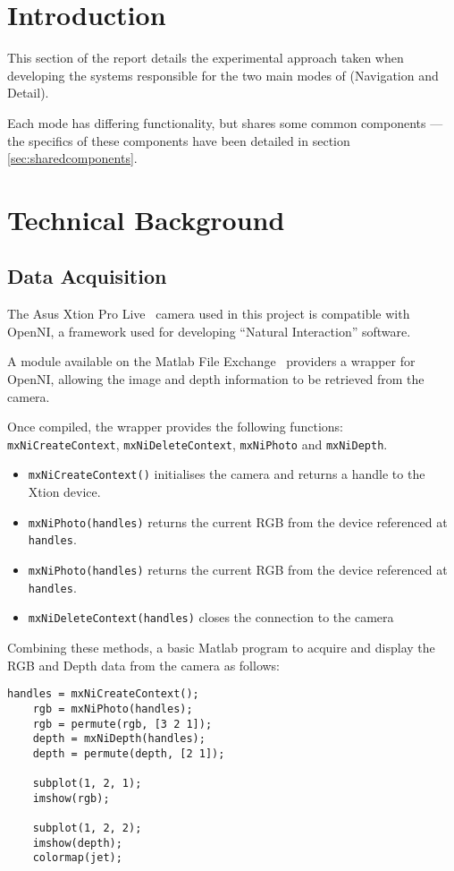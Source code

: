 \section{Introduction}
This section of the report details the experimental approach taken when developing the systems responsible for the two main modes of (Navigation and Detail).

Each mode has differing functionality, but shares some common components --- the specifics of these components have been detailed in section \ref{sec:sharedcomponents}.   

\section{Technical Background}
\subsection{Data Acquisition}
The Asus Xtion Pro Live~\cite{xtion} camera used in this project is compatible with OpenNI, a framework used for developing ``Natural Interaction'' software.

A module available on the Matlab File Exchange~\cite{matlabwrapper} providers a wrapper for OpenNI, allowing the image and depth information to be retrieved from the camera.

Once compiled, the wrapper provides the following functions: \texttt{mxNiCreateContext}, \texttt{mxNiDeleteContext}, \texttt{mxNiPhoto} and \texttt{mxNiDepth}.

\begin{itemize}
    \item \texttt{mxNiCreateContext()} initialises the camera and returns a handle to the Xtion device.
    \item \texttt{mxNiPhoto(handles)} returns the current \ac{RGB} from the device referenced at \texttt{handles}.
    \item \texttt{mxNiPhoto(handles)} returns the current \ac{RGB} from the device referenced at \texttt{handles}.
    \item \texttt{mxNiDeleteContext(handles)} closes the connection to the camera 
\end{itemize}

Combining these methods, a basic Matlab program to acquire and display the RGB and Depth data from the camera as follows: 

\begin{lstlisting}[caption = {Acquiring Depth and RGB in Matlab}]
    handles = mxNiCreateContext();
    rgb = mxNiPhoto(handles);
    rgb = permute(rgb, [3 2 1]);
    depth = mxNiDepth(handles);
    depth = permute(depth, [2 1]);

    subplot(1, 2, 1);
    imshow(rgb);

    subplot(1, 2, 2);
    imshow(depth);
    colormap(jet);
\end{lstlisting}

